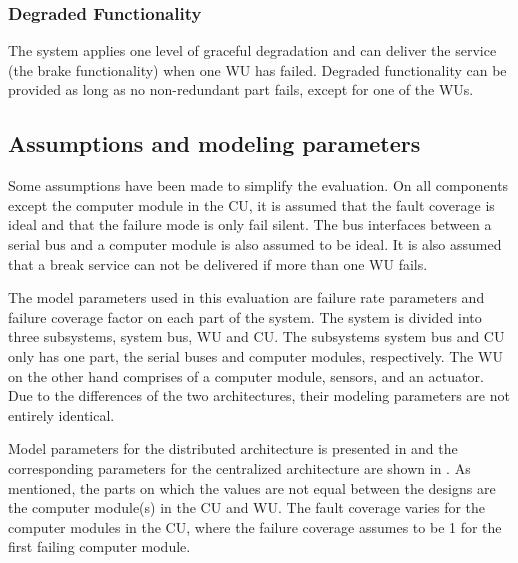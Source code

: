 \subsubsection{Degraded Functionality}
The system applies one level of graceful degradation and can deliver the service (the brake functionality) when one WU has failed. Degraded functionality can be provided as long as no non-redundant part fails, except for one of the WUs.
\subsection{Assumptions and modeling parameters}

Some assumptions have been made to simplify the evaluation. On all components except the computer module in the CU, it is assumed that the fault coverage is ideal and that the failure mode is only fail silent. The bus interfaces between a serial bus and a computer module is also assumed to be ideal. It is also assumed that a break service can not be delivered if more than one WU fails.

The model parameters used in this evaluation are failure rate parameters and failure coverage factor on each part of the system. The system is divided into three subsystems, system bus, WU and CU. The subsystems system bus and CU only has one part, the serial buses and computer modules, respectively. The WU on the other hand comprises of a computer module, sensors, and an actuator. Due to the differences of the two architectures, their modeling parameters are not entirely identical. 

Model parameters for the distributed architecture is presented in  and the corresponding parameters for the centralized architecture are shown in . As mentioned, the parts on which the values are not equal between the designs are the computer module(s) in the CU and WU. The fault coverage varies for the computer modules in the CU, where the failure coverage assumes to be 1 for the first failing computer module.

